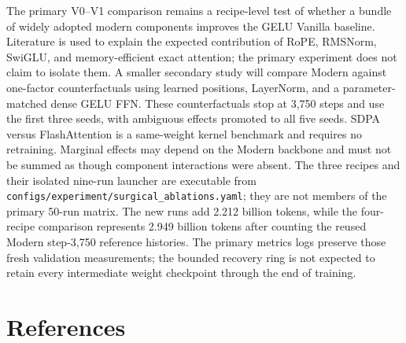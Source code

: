 \documentclass[11pt,a4paper]{article}
\theoremstyle{definition}
\theoremstyle{plain}
\begin{document}
The primary V0--V1 comparison remains a recipe-level test of whether a bundle of
widely adopted modern components improves the GELU Vanilla baseline.  Literature is
used to explain the expected contribution of RoPE, RMSNorm, SwiGLU, and
memory-efficient exact attention; the primary experiment does not claim to isolate
them.  A smaller secondary study will compare Modern against one-factor
counterfactuals using learned positions, LayerNorm, and a parameter-matched dense
GELU FFN.  These counterfactuals stop at 3,750 steps and use the first three seeds,
with ambiguous effects promoted to all five seeds.  SDPA versus FlashAttention is a
same-weight kernel benchmark and requires no retraining.  Marginal effects may depend
on the Modern backbone and must not be summed as though component interactions were
absent.  The three recipes and their isolated nine-run launcher are executable from
\texttt{configs/experiment/surgical\_ablations.yaml}; they are not members of the
primary 50-run matrix.  The new runs add 2.212 billion tokens, while the four-recipe
comparison represents 2.949 billion tokens after counting the reused Modern
step-3,750 reference histories.  The primary metrics logs preserve those fresh
validation measurements; the bounded recovery ring is not expected to retain every
intermediate weight checkpoint through the end of training.

\section{References}
\end{document}
